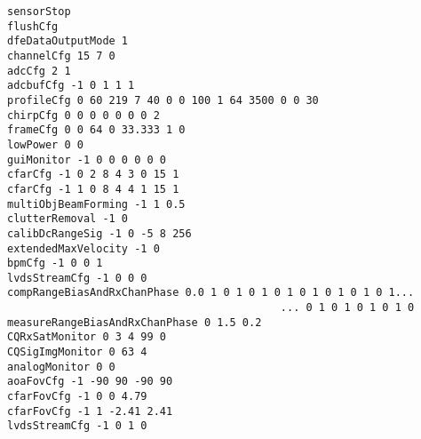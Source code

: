 \begin{lstlisting}
sensorStop
flushCfg
dfeDataOutputMode 1
channelCfg 15 7 0
adcCfg 2 1
adcbufCfg -1 0 1 1 1
profileCfg 0 60 219 7 40 0 0 100 1 64 3500 0 0 30
chirpCfg 0 0 0 0 0 0 0 2
frameCfg 0 0 64 0 33.333 1 0
lowPower 0 0
guiMonitor -1 0 0 0 0 0 0
cfarCfg -1 0 2 8 4 3 0 15 1
cfarCfg -1 1 0 8 4 4 1 15 1
multiObjBeamForming -1 1 0.5
clutterRemoval -1 0
calibDcRangeSig -1 0 -5 8 256
extendedMaxVelocity -1 0
bpmCfg -1 0 0 1
lvdsStreamCfg -1 0 0 0
compRangeBiasAndRxChanPhase 0.0 1 0 1 0 1 0 1 0 1 0 1 0 1 0 1...
                                           ... 0 1 0 1 0 1 0 1 0
measureRangeBiasAndRxChanPhase 0 1.5 0.2
CQRxSatMonitor 0 3 4 99 0
CQSigImgMonitor 0 63 4
analogMonitor 0 0
aoaFovCfg -1 -90 90 -90 90
cfarFovCfg -1 0 0 4.79
cfarFovCfg -1 1 -2.41 2.41
lvdsStreamCfg -1 0 1 0
\end{lstlisting}